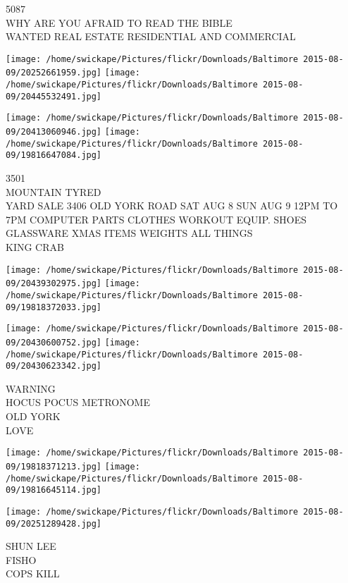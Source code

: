 \documentclass[10pt,letterpaper]{article}
\begin{document}
5087\\
WHY ARE YOU AFRAID TO READ THE BIBLE\\
WANTED REAL ESTATE RESIDENTIAL AND COMMERCIAL\\
\pagebreak

\texttt{[image: /home/swickape/Pictures/flickr/Downloads/Baltimore 2015-08-09/20252661959.jpg]}
\texttt{[image: /home/swickape/Pictures/flickr/Downloads/Baltimore 2015-08-09/20445532491.jpg]}

\texttt{[image: /home/swickape/Pictures/flickr/Downloads/Baltimore 2015-08-09/20413060946.jpg]}
\texttt{[image: /home/swickape/Pictures/flickr/Downloads/Baltimore 2015-08-09/19816647084.jpg]}

3501\\
MOUNTAIN TYRED\\
YARD SALE 3406 OLD YORK ROAD SAT AUG 8 SUN AUG 9 12PM TO 7PM COMPUTER PARTS CLOTHES WORKOUT EQUIP. SHOES GLASSWARE XMAS ITEMS WEIGHTS ALL THINGS\\
KING CRAB\\
\pagebreak

\texttt{[image: /home/swickape/Pictures/flickr/Downloads/Baltimore 2015-08-09/20439302975.jpg]}
\texttt{[image: /home/swickape/Pictures/flickr/Downloads/Baltimore 2015-08-09/19818372033.jpg]}

\texttt{[image: /home/swickape/Pictures/flickr/Downloads/Baltimore 2015-08-09/20430600752.jpg]}
\texttt{[image: /home/swickape/Pictures/flickr/Downloads/Baltimore 2015-08-09/20430623342.jpg]}

WARNING\\
HOCUS POCUS METRONOME\\
OLD YORK\\
LOVE\\
\pagebreak

\texttt{[image: /home/swickape/Pictures/flickr/Downloads/Baltimore 2015-08-09/19818371213.jpg]}
\texttt{[image: /home/swickape/Pictures/flickr/Downloads/Baltimore 2015-08-09/19816645114.jpg]}

\vspace{0.25in}
\texttt{[image: /home/swickape/Pictures/flickr/Downloads/Baltimore 2015-08-09/20251289428.jpg]}

SHUN LEE\\
FISHO\\
COPS KILL\\
\pagebreak
\end{document}
